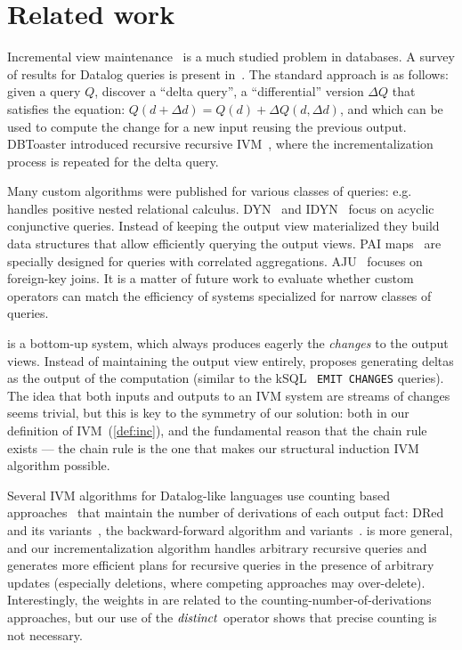 \section{Related work}\label{sec:related}

Incremental view maintenance~\cite{gupta-sigmod93, griffin-sigmod95, chaudhuri-icde95,
gupta-idb95, chirkova-book12} is a much studied problem in databases.
A survey of results for Datalog queries is present in~\cite{motik-ai19}.
The standard approach is as follows: given a query $Q$, discover a ``delta query'',
a ``differential'' version $\Delta Q$ that satisfies the equation:
$Q(d+\Delta d)=Q(d)+\Delta Q(d,\Delta d)$, and which can be used to compute
the change for a new input reusing the previous output.
DBToaster introduced recursive recursive IVM~\cite{ahmad-vldb09, koch-pods10}, where
the incrementalization process is repeated for the delta query.

Many custom algorithms were published for various classes of queries: e.g.~\cite{koch-pods16}
handles positive nested relational calculus.  DYN~\cite{idris-sigmod17}
and IDYN~\cite{idris-vldb18, idris-sigmod19} focus on acyclic conjunctive queries.  Instead
of keeping the output view materialized they build data structures that allow efficiently
querying the output views.  PAI maps~\cite{abeysinghe-sigmod22} are specially
designed for queries with correlated aggregations.
AJU~\cite{wang-sigmod20} focuses on foreign-key joins.  It is a matter
of future work to evaluate whether custom \dbsp operators
can match the efficiency of systems specialized for narrow classes
of queries.

\dbsp is a bottom-up system, which always produces eagerly
the \emph{changes} to the output views.
Instead of maintaining the output view entirely, \dbsp proposes
generating deltas as the output of the computation (similar to the kSQL~\cite{jafarpour-edbt19}
\texttt{EMIT CHANGES} queries).  The idea that both
inputs and outputs to an IVM system are streams of changes
seems trivial, but this is key to the symmetry of our solution:
both in our definition of IVM~(\ref{def:inc}), and the fundamental
reason that the chain rule exists --- the chain rule is the one that makes our
structural induction IVM algorithm possible.

Several IVM algorithms for Datalog-like languages use counting based
approaches~\cite{Dewan-iis92,motik-aaai15} that maintain the number of derivations of each
output fact: DRed~\cite{gupta-sigmod93} and its variants~\cite{Ceri-VLDB91,Wolfson-sigmod91,
Staudt-vldb96,Kotowski-rr11,Lu-sigmod95,Apt-sigmod87}, the backward-forward algorithm
and variants~\cite{motik-aaai15,Harrison-wdd92,motik-ai19}.
\dbsp is more general,
and our incrementalization algorithm handles arbitrary recursive queries and
generates more efficient plans for recursive queries
in the presence of arbitrary updates (especially deletions, where competing approaches
may over-delete).  Interestingly, the \zrs weights in \dbsp are related
to the counting-number-of-derivations approaches, but our use of the $\mathit{distinct}$
operator shows that precise counting is not necessary.

